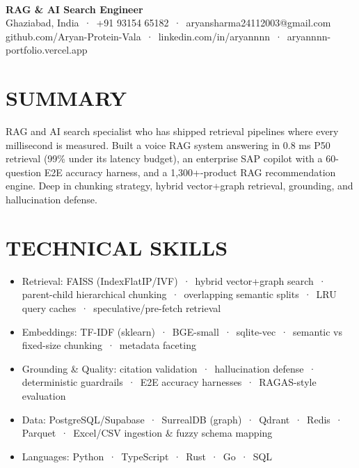 \documentclass[9pt]{article}
\begin{document}
\\[3pt]
{\large\bfseries RAG \& AI Search Engineer}\\[3pt]
{\small\color{greyc} Ghaziabad, India \,·\, +91 93154 65182 \,·\, aryansharma24112003@gmail.com}\vspace{-2pt}
{\small\color{greyc} github.com/Aryan-Protein-Vala \,·\, linkedin.com/in/aryannnn \,·\, aryannnn-portfolio.vercel.app}\vspace{-2pt}
\section*{SUMMARY}
RAG and AI search specialist who has shipped retrieval pipelines where every millisecond is measured. Built a voice RAG system answering in 0.8 ms P50 retrieval (99\% under its latency budget), an enterprise SAP copilot with a 60-question E2E accuracy harness, and a 1,300+-product RAG recommendation engine. Deep in chunking strategy, hybrid vector+graph retrieval, grounding, and hallucination defense.
\vspace{1pt}
\section*{TECHNICAL SKILLS}
\begin{itemize}[leftmargin=11pt,itemsep=0pt,topsep=1pt,parsep=0pt]
\item Retrieval: FAISS (IndexFlatIP/IVF) \,·\, hybrid vector+graph search \,·\, parent-child hierarchical chunking \,·\, overlapping semantic splits \,·\, LRU query caches \,·\, speculative/pre-fetch retrieval
\item Embeddings: TF-IDF (sklearn) \,·\, BGE-small \,·\, sqlite-vec \,·\, semantic vs fixed-size chunking \,·\, metadata faceting
\item Grounding \& Quality: citation validation \,·\, hallucination defense \,·\, deterministic guardrails \,·\, E2E accuracy harnesses \,·\, RAGAS-style evaluation
\item Data: PostgreSQL/Supabase \,·\, SurrealDB (graph) \,·\, Qdrant \,·\, Redis \,·\, Parquet \,·\, Excel/CSV ingestion \& fuzzy schema mapping
\item Languages: Python \,·\, TypeScript \,·\, Rust \,·\, Go \,·\, SQL
\end{itemize}
\end{document}
